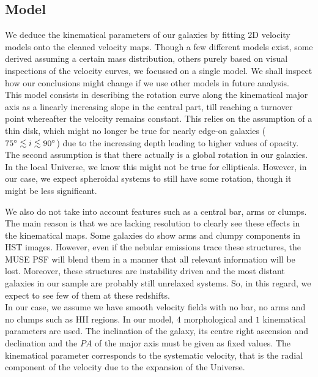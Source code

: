 \subsection{Model}
\label{subsec:model}

We deduce the kinematical parameters of our galaxies by fitting 2D velocity models onto the cleaned velocity maps. Though a few different models exist, some derived assuming a certain mass distribution, others purely based on visual inspections of the velocity curves, we focussed on a single model. We shall inspect how our conclusions might change if we use other models in future analysis. \\

This model consists in describing the rotation curve along the kinematical major axis as a linearly increasing slope in the central part, till reaching a turnover point whereafter the velocity remains constant. This relies on the assumption of a thin disk, which might no longer be true for nearly edge-on galaxies ($75 \degree \lesssim i \lesssim 90 \degree$) due to the increasing depth leading to higher values of opacity. The second assumption is that there actually is a global rotation in our galaxies. In the local Universe, we know this might not be true for ellipticals. However, in our case, we expect spheroidal systems to still have some rotation, though it might be less significant.

We also do not take into account features such as a central bar, arms or clumps. The main reason is that we are lacking resolution to clearly see these effects in the kinematical maps. Some galaxies do show arms and clumpy components in HST images. However, even if the nebular emissions trace these structures, the MUSE PSF will blend them in a manner that all relevant information will be lost. Moreover, these structures are instability driven and the most distant galaxies in our sample are probably still unrelaxed systems. So, in this regard, we expect to see few of them at these redshifts.\\

In our case, we assume we have smooth velocity fields with no bar, no arms and no clumps such as HII regions.
In our model, $4$ morphological and $1$ kinematical parameters are used. The inclination of the galaxy, its centre right ascension and declination and the $PA$ of the major axis must be given as fixed values. The kinematical parameter corresponds to the systematic velocity, that is the radial component of the velocity due to the expansion of the Universe.

